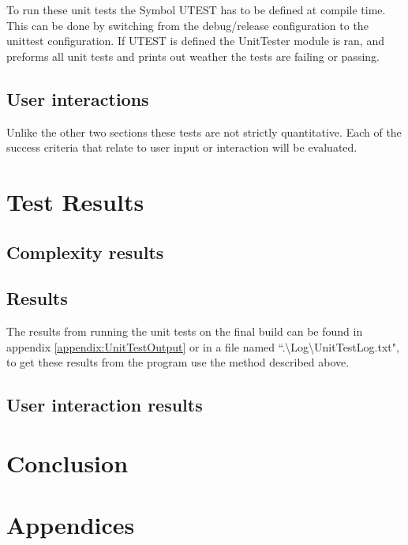 \documentclass[10pt]{article} %
\begin{document}
		    To run these unit tests the Symbol UTEST has to be defined at compile time. This can be done by switching from the debug/release configuration to the unittest configuration. If UTEST is defined the UnitTester module is ran, and preforms all unit tests and prints out weather the tests are failing or passing. 
			     
		\subsection{User interactions}
			Unlike the other two sections these tests are not strictly quantitative. Each of the success criteria that relate to user input or interaction will be evaluated. 
			
	\section{Test Results}
	        \subsection{Complexity results}

            \subsection{Results}
			     The results from running the unit tests on the final build can be found in appendix \ref{appendix:UnitTestOutput} or in a file named ``.\textbackslash Log\textbackslash UnitTestLog.txt", to get these results from the program use the method described above.
			     
			\subsection{User interaction results}
            
    \section{Conclusion}
	\newpage
	\printbibliography
	\newpage
	
    \appendix
    \section*{Appendices}
    \renewcommand{\thesubsection}{\Alph{subsection}}
\end{document}
